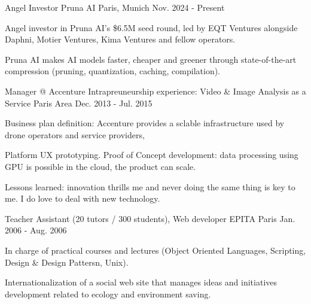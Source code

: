 
\begin{cventries}

  \cventry
    {Angel Investor} %
    {Pruna AI} %
    {Paris, Munich} %
    {Nov. 2024 - Present} %
    {
      \begin{cvitems} %
        \item {Angel investor in Pruna AI's \$6.5M seed round, led by EQT Ventures alongside Daphni, Motier Ventures, Kima Ventures and fellow operators.}
        \item {Pruna AI makes AI models faster, cheaper and greener through state-of-the-art compression (pruning, quantization, caching, compilation).}
      \end{cvitems}
    }

  \cventry
    {Manager @ Accenture} %
    {Intrapreuneurship experience: Video \& Image Analysis as a Service} %
    {Paris Area} %
    {Dec. 2013 - Jul. 2015} %
    {
      \begin{cvitems} %
        \item {Business plan definition: Accenture provides a sclable infrastructure used by drone operators and service providers,}
        \item {Platform UX prototyping. Proof of Concept development: data processing using GPU is possible in the cloud, the product can scale.}
        \item {Lessons learned: innovation thrills me and never doing the same thing is key to me. I do love to deal with new technology.}
      \end{cvitems}
    }

  \cventry
    {Teacher Assistant (20 tutors / 300 students), Web developer} %
    {EPITA} %
    {Paris} %
    {Jan. 2006 - Aug. 2006} %
    {
      \begin{cvitems} %
        \item {In charge of practical courses and lectures (Object Oriented Languages, Scripting, Design \& Design Pattersn, Unix).}
        \item {Internationalization of a social web site that manages ideas and initiatives development related to ecology and environment saving.}
      \end{cvitems}
    }

\end{cventries}
